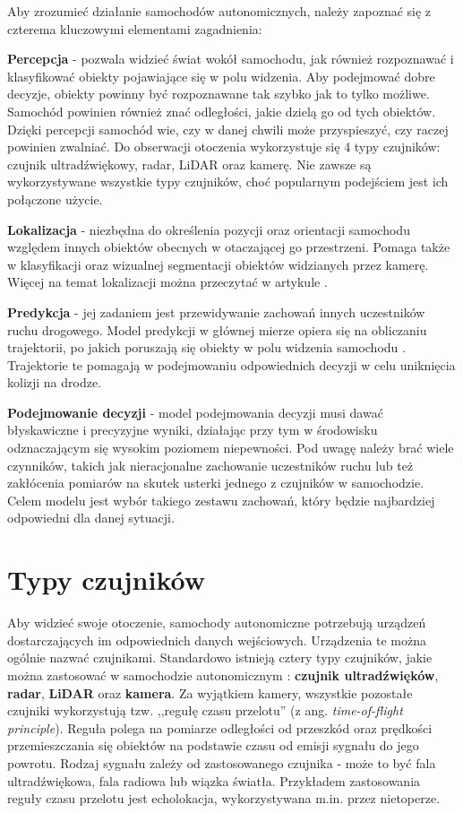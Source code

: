 Aby zrozumieć działanie samochodów autonomicznych, należy zapoznać się z czterema kluczowymi elementami zagadnienia:
\begin{enumerate*}
\item \textbf{Percepcja} - pozwala widzieć świat wokół samochodu, jak również rozpoznawać i klasyfikować obiekty pojawiające się w polu widzenia. Aby podejmować dobre decyzje, obiekty powinny być rozpoznawane tak szybko jak to tylko możliwe. Samochód powinien również znać odległości, jakie dzielą go od tych obiektów. Dzięki percepcji samochód wie, czy w danej chwili może przyspieszyć, czy raczej powinien zwalniać. Do obserwacji otoczenia wykorzystuje się 4 typy czujników: czujnik ultradźwiękowy, radar, LiDAR oraz kamerę. Nie zawsze są wykorzystywane wszystkie typy czujników, choć popularnym podejściem jest ich połączone użycie.
\item \textbf{Lokalizacja} - niezbędna do określenia pozycji oraz orientacji samochodu względem innych obiektów obecnych w otaczającej go przestrzeni. Pomaga także w klasyfikacji oraz wizualnej segmentacji obiektów widzianych przez kamerę. Więcej na temat lokalizacji można przeczytać w artykule \cite{nvidia:localisation}.
\item \textbf{Predykcja} - jej zadaniem jest przewidywanie zachowań innych uczestników ruchu drogowego. Model predykcji w głównej mierze opiera się na obliczaniu trajektorii, po jakich poruszają się obiekty w polu widzenia samochodu \cite{singh:prediction}. Trajektorie te pomagają w podejmowaniu odpowiednich decyzji w celu uniknięcia kolizji na drodze.
\item \textbf{Podejmowanie decyzji} - model podejmowania decyzji musi dawać błyskawiczne i precyzyjne wyniki, działając przy tym w środowisku odznaczającym się wysokim poziomem niepewności. Pod uwagę należy brać wiele czynników, takich jak nieracjonalne zachowanie uczestników ruchu lub też zakłócenia pomiarów na skutek usterki jednego z czujników w samochodzie. Celem modelu jest wybór takiego zestawu zachowań, który będzie najbardziej odpowiedni dla danej sytuacji.
\end{enumerate*}

\section{Typy czujników}
Aby widzieć swoje otoczenie, samochody autonomiczne potrzebują urządzeń dostarczających im odpowiednich danych wejściowych. Urządzenia te można ogólnie nazwać czujnikami. Standardowo istnieją cztery typy czujników, jakie można zastosować w samochodzie autonomicznym \cite{petit:sensorFusion}: \textbf{czujnik ultradźwięków}, \textbf{radar}, \textbf{LiDAR} oraz \textbf{kamera}.
Za wyjątkiem kamery, wszystkie pozostałe czujniki wykorzystują tzw. ,,regułę czasu przelotu'' (z ang. \textit{time-of-flight principle}).
Reguła polega na pomiarze odległości od przeszkód oraz prędkości przemieszczania się obiektów na podstawie czasu od emisji sygnału do jego powrotu. Rodzaj sygnału zależy od zastosowanego czujnika - może to być fala ultradźwiękowa, fala radiowa lub wiązka światła. Przykładem zastosowania reguły czasu przelotu jest echolokacja, wykorzystywana m.in. przez nietoperze.

